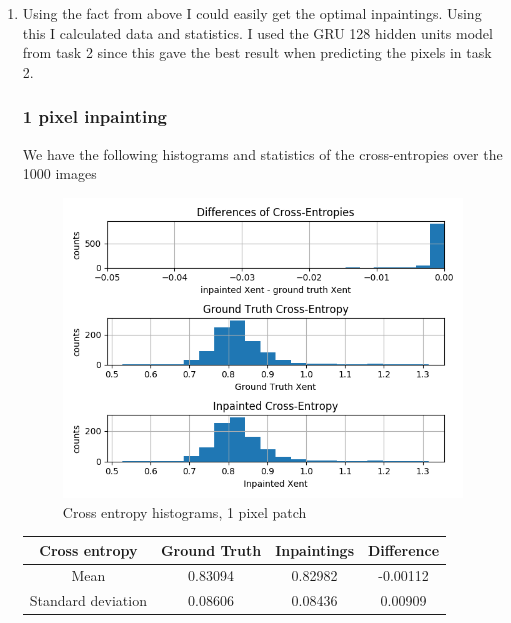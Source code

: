 \documentclass{article}
\begin{document}
\begin{enumerate}
\begin{description}
    \end{description}
    
  \item

    Using the fact from above I could easily get the optimal inpaintings. Using
    this I calculated data and statistics. I used the GRU 128 hidden units model
    from task 2 since this gave the best result when predicting the pixels in
    task 2.

    \subsubsection{1 pixel inpainting}

    We have the following histograms and statistics of the cross-entropies over the 1000 images

    \begin{figure}[H]
      \centering
      \includegraphics[width=1.0\textwidth]{task3/inpainting_1_hist.png}
      \caption{Cross entropy histograms, 1 pixel patch}
      \label{fig:Xent_hists_1}
    \end{figure}

    \begin{center}
      \begin{tabular}{ |c|c|c|c| } 
        \hline
        Cross entropy & Ground Truth & Inpaintings & Difference \\
        \hline
        Mean & 0.83094 & 0.82982 & -0.00112 \\
        Standard deviation & 0.08606 & 0.08436 & 0.00909 \\
        \hline
      \end{tabular}
    \end{center}


\end{enumerate}
\end{document}
